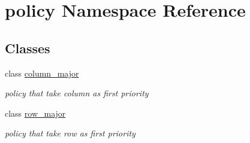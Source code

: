 \hypertarget{namespacepolicy}{}\section{policy Namespace Reference}
\label{namespacepolicy}
\subsection*{Classes}
\begin{DoxyCompactItemize}
\item 
class \mbox{\hyperlink{classpolicy_1_1column__major}{column\+\_\+major}}
\begin{DoxyCompactList}\small\item\em policy that take column as first priority \end{DoxyCompactList}\item 
class \mbox{\hyperlink{classpolicy_1_1row__major}{row\+\_\+major}}
\begin{DoxyCompactList}\small\item\em policy that take row as first priority \end{DoxyCompactList}\end{DoxyCompactItemize}
